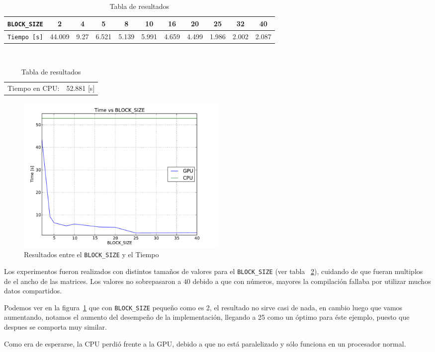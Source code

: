 \begin{table}[!ht]
\begin{center}
	\begin{tabular}{|l|c|c|c|c|c|c|c|c|c|c|}
		\hline
		\texttt{BLOCK\_SIZE} & 2 & 4 & 5 & 8 & 10 & 16 & 20 & 25 & 32 & 40 \\\hline
		\texttt{Tiempo [s]}  & 44.009 & 9.27 & 6.521 & 5.139 & 5.991 & 4.659 & 4.499 & 1.986 & 2.002 & 2.087 \\\hline
	\end{tabular}
	\\
	\begin{tabular}{cc}
		Tiempo en CPU: & 52.881 [s] \\
	\end{tabular}
\end{center}
\caption{Tabla de resultados}
\label{table:1}
\end{table}

\begin{figure}
\begin{center}
	\includegraphics[width=0.5\textwidth]{img/plot-proyecto.pdf}
\end{center}
\caption{Resultados entre el \texttt{BLOCK\_SIZE} y el Tiempo}
\label{fig:1}
\end{figure}

Los experimentos fueron realizados con distintos tamaños de
valores para el \texttt{BLOCK\_SIZE} (ver tabla ~\ref{table:1}), cuidando de que fueran
multiplos de el ancho de las matrices.
Los valores no sobrepasaron a $40$ debido a que con números,
mayores la compilación fallaba por utilizar muchos datos compartidos.

Podemos ver en la figura~\ref{fig:1} que con \texttt{BLOCK\_SIZE} pequeño como es 2,
el resultado no sirve casi de nada, en cambio luego que vamos aumentando,
notamos el aumento del desempeño de la implementación, llegando
a 25 como un óptimo para éste ejemplo, puesto que despues se comporta
muy similar.

Como era de esperarse, la CPU perdió frente a la GPU,
debido a que no está paralelizado y sólo funciona en un procesador
normal.

